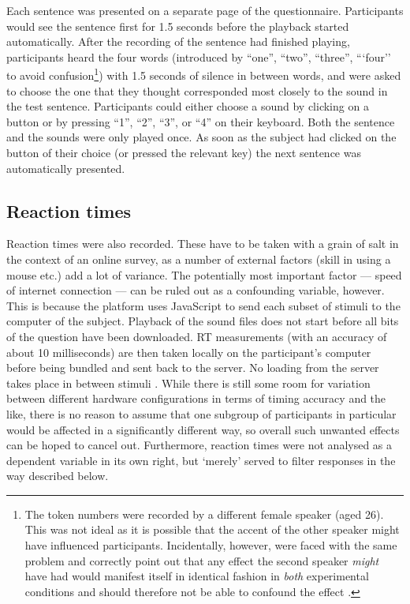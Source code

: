 Each sentence was presented on a separate page of the questionnaire.
Participants would see the sentence first for 1.5 seconds before the playback started automatically.
After the recording of the sentence had finished playing, participants heard the four  words (introduced by ``one'', ``two'', ``three'', ```four'' to avoid confusion\footnote{The token numbers were recorded by a different female speaker (aged 26). This was not ideal as it is possible that the accent of the other speaker might have influenced participants. Incidentally, however, \citeauthor{haydrager2010} were faced with the same problem and correctly point out that any effect the second speaker \emph{might} have had would manifest itself in identical fashion in \emph{both} experimental conditions and should therefore not be able to confound the  effect \parencite[cf.][871 and 889]{haydrager2010}.}) with 1.5 seconds of silence in between words, and were asked to choose the one that they thought corresponded most closely to the sound in the test sentence.
Participants could either choose a sound by clicking on a button or by pressing ``1'', ``2'', ``3'', or ``4'' on their keyboard.
Both the sentence and the  sounds were only played once.
As soon as the subject had clicked on the button of their choice (or pressed the relevant key) the next sentence was automatically presented.

\subsection{Reaction times}
\label{sec.perc_method.pres.rt}

Reaction times were also recorded.
These have to be taken with a grain of salt in the context of an online survey, as a number of external factors (skill in using a mouse etc.) add a lot of variance.
The potentially most important factor --- speed of internet connection --- can be ruled out as a confounding variable, however.
This is because the platform uses JavaScript to send each subset of stimuli to the computer of the subject.
Playback of the sound files does not start before all bits of the question have been downloaded.
RT measurements (with an accuracy of about 10 milliseconds) are then taken locally on the participant's computer before being bundled and sent back to the server.
No loading from the server takes place in between stimuli \parencite[cf.][]{sosci}.
While there is still some room for variation between different hardware configurations in terms of timing accuracy and the like, there is no reason to assume that one subgroup of participants in particular would be affected in a significantly different way, so overall such unwanted effects can be hoped to cancel out.
Furthermore, reaction times were not analysed as a dependent variable in its own right, but `merely' served to filter responses in the way described below.

